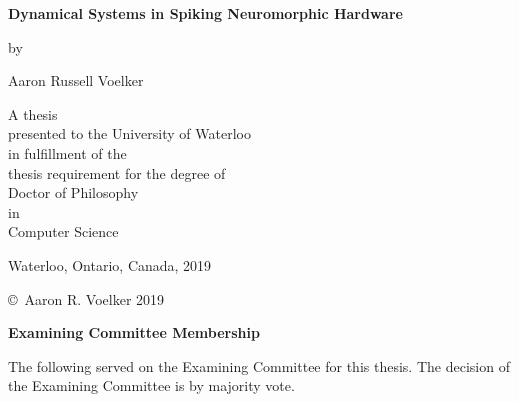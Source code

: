 \pagestyle{empty}

\begin{titlepage}
  \begin{center}
    \vspace*{1.0cm}

    \Huge
    {\bf Dynamical Systems in Spiking Neuromorphic Hardware}

    \vspace*{1.0cm}

    \normalsize
    by \\

    \vspace*{1.0cm}

    \Large
    Aaron Russell Voelker \\

    \vspace*{3.0cm}

    \normalsize
    A thesis \\
    presented to the University of Waterloo \\
    in fulfillment of the \\
    thesis requirement for the degree of \\
    Doctor of Philosophy \\
    in \\
    Computer Science \\

    \vspace*{2.0cm}

    Waterloo, Ontario, Canada, 2019 \\

    \vspace*{1.0cm}

    \copyright\ Aaron R. Voelker 2019 \\
  \end{center}
\end{titlepage}

\pagestyle{plain}
\setcounter{page}{2}

\cleardoublepage

{}
\begin{center}\textbf{Examining Committee Membership}\end{center}

\noindent
The following served on the Examining Committee for this thesis.
The decision of the Examining Committee is by majority vote.


